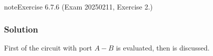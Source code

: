 \documentclass[letterpaper,10pt,english]{jupyterBook}
\begin{document}
\begin{sphinxadmonition}{note}{Exercise 6.7.6 (Exam 2025\sphinxhyphen{}02\sphinxhyphen{}11, Exercise 2.)}



\begin{figure}[htbp]
\centering

\noindent{}
\end{figure}
\subsubsection*{Solution}

\sphinxAtStartPar
First {\hyperref[\detokenize{ch/electrical-engineering-networks:classical-electromagnetism-electrical-engineering-newtork-analysis-thevenin-1-port}]{}} of the circuit with port \(A-B\) is evaluated, then {\hyperref[\detokenize{ch/electrical-engineering-networks-harmonic:classical-electromagnetism-electrical-engineering-newtork-analysis-harmonic-power}]{}} is discussed.


\end{sphinxadmonition}
\end{document}
